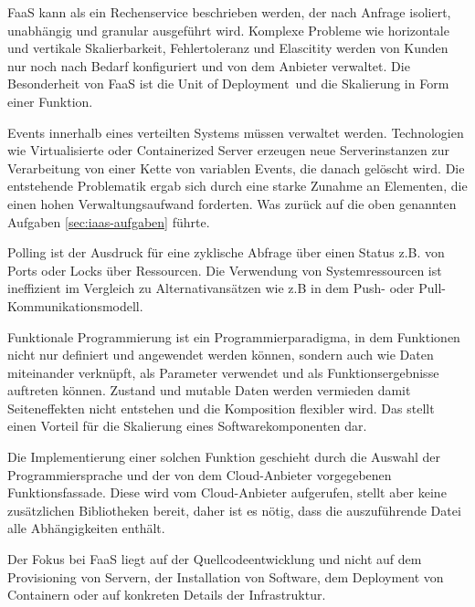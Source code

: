 \documentclass[
12pt,
english,
ngerman,
headsepline,
twoside,
openright,
numbers=noenddot,version=first
]{scrreprt}
\begin{document}
\acrfull{FaaS}\label{sec:faas} kann als ein Rechenservice beschrieben werden, der nach Anfrage isoliert, unabhängig und granular ausgeführt wird. Komplexe Probleme wie horizontale und vertikale Skalierbarkeit, Fehlertoleranz und Elascitity werden von Kunden nur noch nach Bedarf konfiguriert und von dem Anbieter verwaltet. Die Besonderheit von \acrshort{FaaS} ist die \glqq Unit of Deployment\grqq\ und die Skalierung in Form einer Funktion. \cite{patternAWS}

Events\label{par:event-reaction} innerhalb eines verteilten Systems müssen verwaltet werden. Technologien wie Virtualisierte oder Containerized Server erzeugen neue Serverinstanzen zur Verarbeitung von einer Kette von variablen Events, die danach gelöscht wird.\cite{lambdaAWS} Die entstehende Problematik ergab sich durch eine starke Zunahme an Elementen, die einen hohen Verwaltungsaufwand forderten.  Was zurück auf die oben genannten Aufgaben \ref{sec:iaas-aufgaben} führte.

Polling\label{par:polling} ist der Ausdruck für eine zyklische Abfrage über einen Status z.B. von Ports oder Locks über Ressourcen. Die Verwendung von Systemressourcen ist ineffizient im Vergleich zu Alternativansätzen wie z.B in dem Push- oder Pull- Kommunikationsmodell.\cite{lambdaAWS} 

Funktionale Programmierung ist ein Programmierparadigma, in dem Funktionen nicht nur definiert und angewendet werden können, sondern auch wie Daten miteinander verknüpft, als Parameter verwendet und als Funktionsergebnisse auftreten können. Zustand und mutable Daten werden vermieden damit Seiteneffekten nicht entstehen und die Komposition flexibler wird. Das stellt einen Vorteil für die Skalierung eines Softwarekomponenten dar.\cite{funcScala}


Die Implementierung einer solchen Funktion geschieht durch die Auswahl der Programmiersprache und der von dem Cloud-Anbieter vorgegebenen Funktionsfassade. Diese wird vom Cloud-Anbieter aufgerufen, stellt aber keine zusätzlichen Bibliotheken bereit, daher ist es nötig, dass die auszuführende Datei alle Abhängigkeiten enthält.


Der Fokus bei \acrshort{FaaS} liegt auf der Quellcodeentwicklung und nicht auf dem Provisioning von Servern, der Installation von Software, dem Deployment von Containern oder auf konkreten Details der Infrastruktur.

\end{document}
